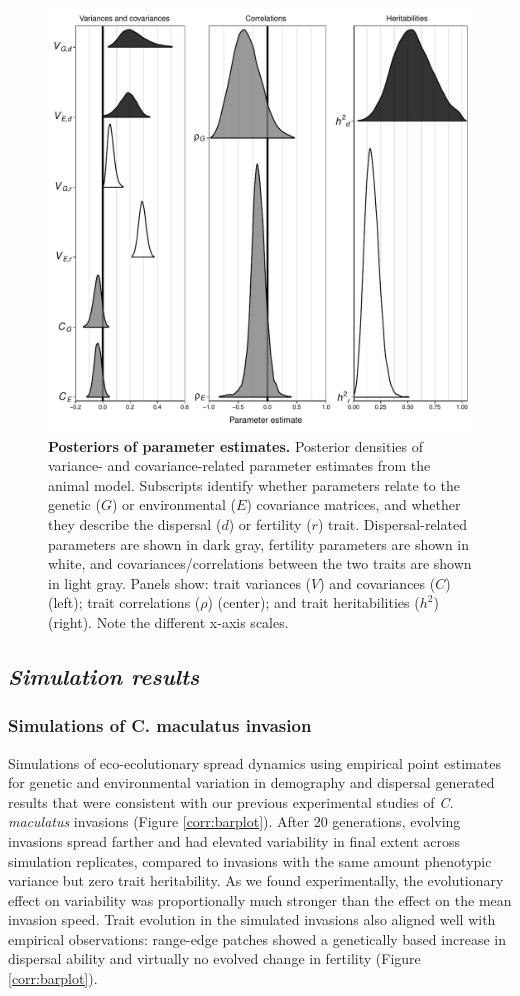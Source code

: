 \documentclass[11pt]{article}
\begin{document}
\begin{figure}[h!]
\centering
\includegraphics[width=0.75\linewidth]{Figures/corr_posteriors.pdf}
\caption{\textbf{Posteriors of parameter estimates.} Posterior densities of variance- and covariance-related parameter estimates from the animal model. Subscripts identify whether parameters relate to the genetic ($G$) or environmental ($E$) covariance matrices, and whether they describe the dispersal ($d$) or fertility ($r$) trait. Dispersal-related parameters are shown in dark gray, fertility parameters are shown in white, and covariances/correlations between the two traits are shown in light gray. Panels show: trait variances ($V$) and covariances ($C$) (left); trait correlations ($\rho$) (center); and trait heritabilities ($h^{2}$) (right). Note the different x-axis scales.}\label{corr:posteriors}
\end{figure}

\newpage
\subsection*{\textit{Simulation results}}
\subsubsection*{Simulations of \textup{C. maculatus} invasion}
Simulations of eco-ecolutionary spread dynamics using empirical point estimates for genetic and environmental variation in demography and dispersal generated results that were consistent with our previous experimental studies of \textit{C. maculatus} invasions (Figure \ref{corr:barplot}).
After 20 generations, evolving invasions spread farther and had elevated variability in final extent across simulation replicates, compared to invasions with the same amount phenotypic variance but zero trait heritability.
As we found experimentally, the evolutionary effect on variability was proportionally much stronger than the effect on the mean invasion speed.
Trait evolution in the simulated invasions also aligned well with empirical observations: range-edge patches showed a genetically based increase in dispersal ability and virtually no evolved change in fertility (Figure \ref{corr:barplot}).
\end{document}
